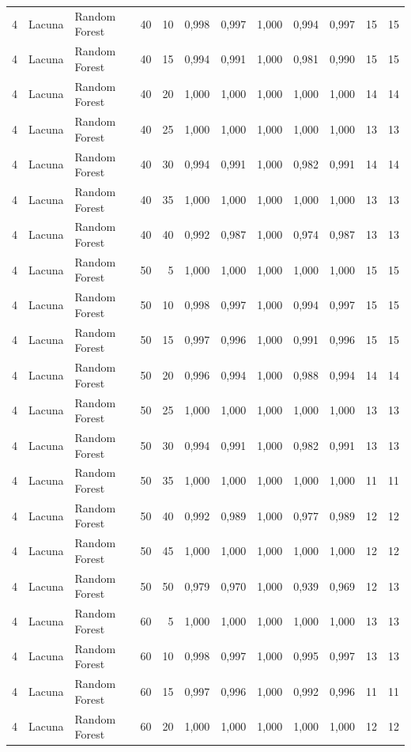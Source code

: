 \begin{longtable}{@{}rllrrrrrrrrr@{}}
4 & Lacuna & Random Forest & 40 & 10 & 0,998 & 0,997 & 1,000 & 0,994 & 0,997 & 15 & 15 \\
4 & Lacuna & Random Forest & 40 & 15 & 0,994 & 0,991 & 1,000 & 0,981 & 0,990 & 15 & 15 \\
4 & Lacuna & Random Forest & 40 & 20 & 1,000 & 1,000 & 1,000 & 1,000 & 1,000 & 14 & 14 \\
4 & Lacuna & Random Forest & 40 & 25 & 1,000 & 1,000 & 1,000 & 1,000 & 1,000 & 13 & 13 \\
4 & Lacuna & Random Forest & 40 & 30 & 0,994 & 0,991 & 1,000 & 0,982 & 0,991 & 14 & 14 \\
4 & Lacuna & Random Forest & 40 & 35 & 1,000 & 1,000 & 1,000 & 1,000 & 1,000 & 13 & 13 \\
4 & Lacuna & Random Forest & 40 & 40 & 0,992 & 0,987 & 1,000 & 0,974 & 0,987 & 13 & 13 \\
4 & Lacuna & Random Forest & 50 & 5 & 1,000 & 1,000 & 1,000 & 1,000 & 1,000 & 15 & 15 \\
4 & Lacuna & Random Forest & 50 & 10 & 0,998 & 0,997 & 1,000 & 0,994 & 0,997 & 15 & 15 \\
4 & Lacuna & Random Forest & 50 & 15 & 0,997 & 0,996 & 1,000 & 0,991 & 0,996 & 15 & 15 \\
4 & Lacuna & Random Forest & 50 & 20 & 0,996 & 0,994 & 1,000 & 0,988 & 0,994 & 14 & 14 \\
4 & Lacuna & Random Forest & 50 & 25 & 1,000 & 1,000 & 1,000 & 1,000 & 1,000 & 13 & 13 \\
4 & Lacuna & Random Forest & 50 & 30 & 0,994 & 0,991 & 1,000 & 0,982 & 0,991 & 13 & 13 \\
4 & Lacuna & Random Forest & 50 & 35 & 1,000 & 1,000 & 1,000 & 1,000 & 1,000 & 11 & 11 \\
4 & Lacuna & Random Forest & 50 & 40 & 0,992 & 0,989 & 1,000 & 0,977 & 0,989 & 12 & 12 \\
4 & Lacuna & Random Forest & 50 & 45 & 1,000 & 1,000 & 1,000 & 1,000 & 1,000 & 12 & 12 \\
4 & Lacuna & Random Forest & 50 & 50 & 0,979 & 0,970 & 1,000 & 0,939 & 0,969 & 12 & 13 \\
4 & Lacuna & Random Forest & 60 & 5 & 1,000 & 1,000 & 1,000 & 1,000 & 1,000 & 13 & 13 \\
4 & Lacuna & Random Forest & 60 & 10 & 0,998 & 0,997 & 1,000 & 0,995 & 0,997 & 13 & 13 \\
4 & Lacuna & Random Forest & 60 & 15 & 0,997 & 0,996 & 1,000 & 0,992 & 0,996 & 11 & 11 \\
4 & Lacuna & Random Forest & 60 & 20 & 1,000 & 1,000 & 1,000 & 1,000 & 1,000 & 12 & 12 \\

\end{longtable}
